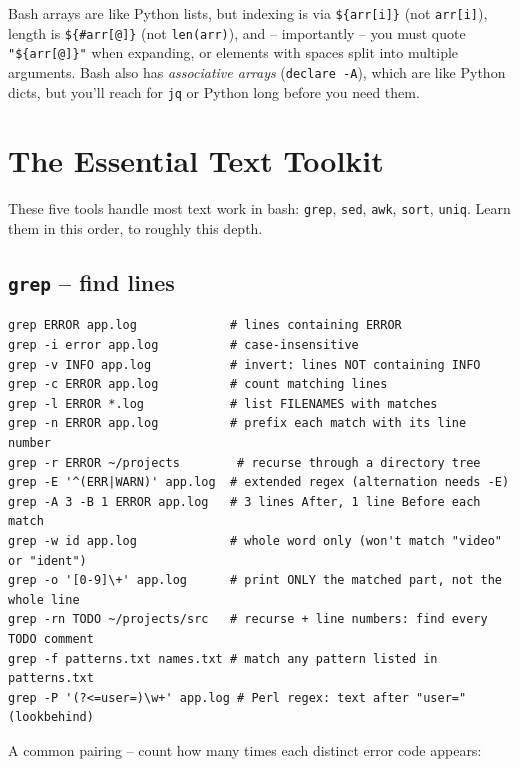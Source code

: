\documentclass[11pt,a4paper]{article}
\newcommand{\cmd}[1]{\texttt{\textcolor{bashKw}{#1}}}
\begin{document}
\begin{comparepy}
Bash arrays are like Python lists, but indexing is via
\texttt{\$\{arr[i]\}} (not \texttt{arr[i]}), length is
\texttt{\$\{\#arr[@]\}} (not \texttt{len(arr)}), and -- importantly
-- you must quote \texttt{"\$\{arr[@]\}"} when expanding, or
elements with spaces split into multiple arguments. Bash also has
\emph{associative arrays} (\texttt{declare -A}), which are like
Python dicts, but you'll reach for \texttt{jq} or Python long
before you need them.
\end{comparepy}

\clearpage
\section{The Essential Text Toolkit}
\label{sec:texttoolkit}

These five tools handle most text work in bash: \cmd{grep},
\cmd{sed}, \cmd{awk}, \cmd{sort}, \cmd{uniq}. Learn them in this
order, to roughly this depth.

\subsection*{\texttt{grep} -- find lines}

\begin{lstlisting}[style=bashstyle]
grep ERROR app.log             # lines containing ERROR
grep -i error app.log          # case-insensitive
grep -v INFO app.log           # invert: lines NOT containing INFO
grep -c ERROR app.log          # count matching lines
grep -l ERROR *.log            # list FILENAMES with matches
grep -n ERROR app.log          # prefix each match with its line number
grep -r ERROR ~/projects        # recurse through a directory tree
grep -E '^(ERR|WARN)' app.log  # extended regex (alternation needs -E)
grep -A 3 -B 1 ERROR app.log   # 3 lines After, 1 line Before each match
grep -w id app.log             # whole word only (won't match "video" or "ident")
grep -o '[0-9]\+' app.log      # print ONLY the matched part, not the whole line
grep -rn TODO ~/projects/src   # recurse + line numbers: find every TODO comment
grep -f patterns.txt names.txt # match any pattern listed in patterns.txt
grep -P '(?<=user=)\w+' app.log # Perl regex: text after "user=" (lookbehind)
\end{lstlisting}

A common pairing -- count how many times each distinct error code appears:
\end{document}
